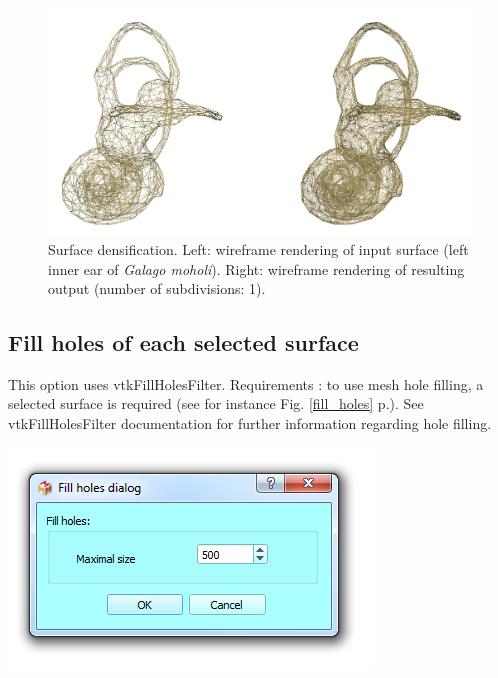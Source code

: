 \begin{figure}
  \centering
  \includegraphics[scale=0.35]{images/09/structure/densification_example.png} 
	\caption{Surface densification. Left: wireframe rendering of input surface (left inner ear of \textit{Galago moholi}). Right: wireframe rendering of resulting output (number of subdivisions: 1).
}
\label{densify}
 
\end{figure}




\subsection{Fill holes of each selected surface}

\noindent
\begin{minipage}{0.5\textwidth}

This option uses vtkFillHolesFilter.
Requirements : to use mesh hole filling, a selected surface is
required (see for instance Fig. \ref{fill_holes} p.\pageref{fill_holes}). See vtkFillHolesFilter documentation for further
information regarding hole filling.


\end{minipage}    
\begin{minipage}{0.5\textwidth}\centering
  \includegraphics[scale=0.5]{images/09/structure/fill_holes_dialog.png}
 \end{minipage} 
\noindent

